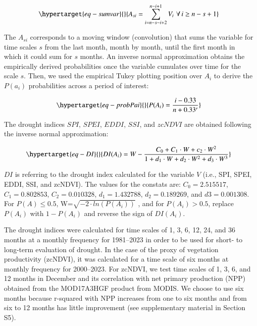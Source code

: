 \documentclass[
  authoryear,
  preprint,
  3p,
  onecolumn]{elsarticle}
\begin{document}
\begin{equation}\protect\hypertarget{eq-sumvar}{}{A_{si} = \sum_{i=n-s-i+2}^{n-i+1} V_i\,\, \forall\, i\geq n-s+1  }\label{eq-sumvar}\end{equation}

The \(A_{si}\) corresponds to a moving window (convolution) that sums
the variable for time scales \(s\) from the last month, month by month,
until the first month in which it could sum for \(s\) months. An inverse
normal approximation \citep{Abramowitz1968} obtains the empirically
derived probabilities once the variable cumulates over time for the
scale \(s\). Then, we used the empirical Tukey plotting position
\citep{Wilks2011} over \(A_i\) to derive the \(P(a_i)\) probabilities
across a period of interest:

\begin{equation}\protect\hypertarget{eq-probPai}{}{P(A_i) = \frac{i-0.33}{n+0.33'}}\label{eq-probPai}\end{equation}

The drought indices \(SPI\), \(SPEI\), \(EDDI\), \(SSI\), and \(zcNDVI\)
are obtained following the inverse normal approximation:

\begin{equation}\protect\hypertarget{eq-DI}{}{DI(A_i) = W - \frac{C_0+C_1\cdot W + c_2 \cdot W^2}{1+d_1\cdot W +d_2\cdot W^2 +d_3\cdot W^3}}\label{eq-DI}\end{equation}

\(DI\) is referring to the drought index calculated for the variable
\(V\) (i.e., SPI, SPEI, EDDI, SSI, and zcNDVI). The values for the
constats are: \(C_0 = 2.515517\), \(C_1 = 0.802853\),
\(C_2 = 0.010328\), \(d_1 = 1.432788\), \(d_2 = 0.189269\), and
\(d3 = 0.001308\). For \(P(A) \leq 0.5\),
W=\(\sqrt{-2\cdot ln(P(A_i))}\) , and for \(P(A_i) > 0.5\), replace
\(P(A_i)\) with \(1-P(A_i)\) and reverse the sign of \(DI(A_i)\).

The drought indices were calculated for time scales of 1, 3, 6, 12, 24,
and 36 months at a monthly frequency for 1981--2023 in order to be used
for short- to long-term evaluation of drought. In the case of the proxy
of vegetation productivity (zcNDVI), it was calculated for a time scale
of six months at monthly frequency for 2000--2023. For zcNDVI, we test
time scales of 1, 3, 6, and 12 months in December and its correlation
with net primary production (NPP) obtained from the MOD17A3HGF product
from MODIS. We choose to use six months because r-squared with NPP
increases from one to six months and from six to 12 months has little
improvement (see supplementary material in Section S5).
\end{document}
